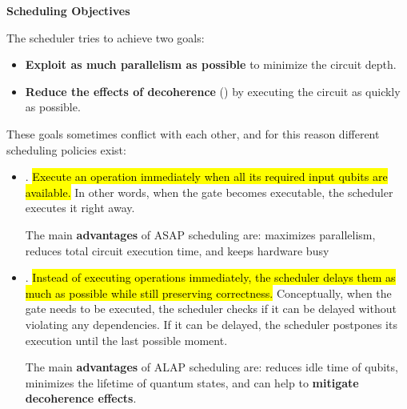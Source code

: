 \highspace
\begin{flushleft}
    \textcolor{Green3}{ \textbf{Scheduling Objectives}}
\end{flushleft}
The scheduler tries to achieve two goals:
\begin{itemize}
    \item \textbf{Exploit as much parallelism as possible} to minimize the circuit depth.
    \item \textbf{Reduce the effects of decoherence} () by executing the circuit as quickly as possible.
\end{itemize}
These goals sometimes conflict with each other, and for this reason different scheduling policies exist:
\begin{itemize}
    \item {}. \hl{Execute an operation immediately when all its required input qubits are available.} In other words, when the gate becomes executable, the scheduler executes it right away.
    
    \textcolor{Green3}{} The main \textbf{advantages} of ASAP scheduling are: maximizes parallelism, reduces total circuit execution time, and keeps hardware busy
    
    
    \item {}. \hl{Instead of executing operations immediately, the scheduler delays them as much as possible while still preserving correctness.} Conceptually, when the gate needs to be executed, the scheduler checks if it can be delayed without violating any dependencies. If it can be delayed, the scheduler postpones its execution until the last possible moment.
    
    \textcolor{Green3}{} The main \textbf{advantages} of ALAP scheduling are: reduces idle time of qubits, minimizes the lifetime of quantum states, and can help to \textbf{mitigate decoherence effects}.
\end{itemize}

